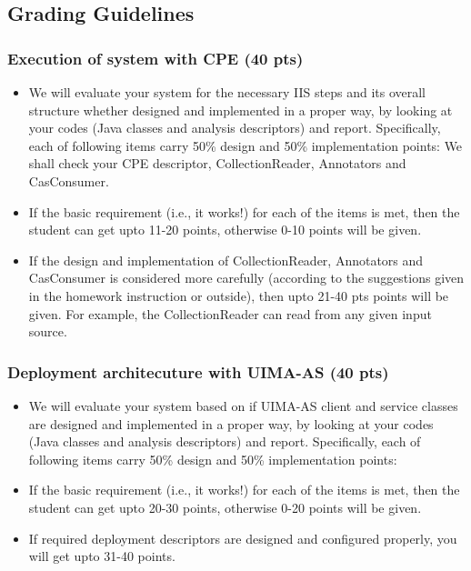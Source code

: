 
\subsection{Grading Guidelines}

\subsubsection{Execution of system with CPE (40 pts)}

\begin{itemize}

\item We will evaluate your system for the necessary IIS steps and its overall structure whether designed and implemented in a proper way, by looking at your
codes (Java classes and analysis descriptors) and report. 
Specifically, each of following items carry 50\% design and 50\% implementation points: 
We shall check your CPE descriptor, CollectionReader, Annotators and CasConsumer.
\item If the basic requirement (i.e., it works!) for each of the items is met,
then the student can get upto 11-20 points, otherwise 0-10 points will be given.

\item If the design and implementation of CollectionReader, Annotators and CasConsumer is considered more carefully (according to the suggestions given in the homework instruction or outside), then upto 21-40 pts points will be given. For example, the CollectionReader can read from any given input source.

\end{itemize}

\subsubsection{Deployment architecuture with UIMA-AS (40 pts)}

\begin{itemize}

\item We will evaluate your system based on if UIMA-AS client and service classes are designed and implemented in a proper way, by looking at your codes (Java classes and analysis descriptors) and report. 
Specifically, each of following items carry 50\% design and 50\% implementation points: 
\item If the basic requirement (i.e., it works!) for each of the items is met,
then the student can get upto 20-30 points, otherwise 0-20 points will be given.

\item If required deployment descriptors are designed and configured properly, you will get upto 31-40 points. 
\end{itemize}

